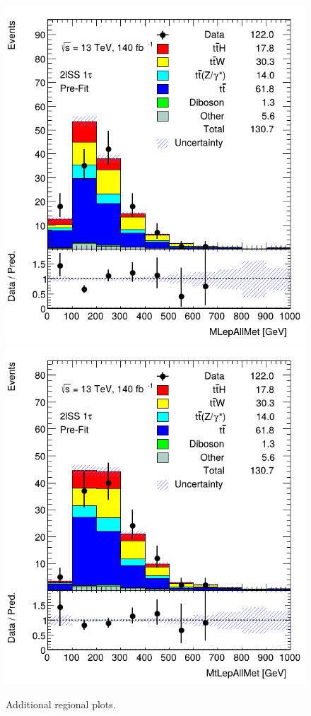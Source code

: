 \begin{figure}[ht!]
    \includegraphics[scale=0.25]{res/AnalysisPlots/wData/mlep-all-met.png}
    \includegraphics[scale=0.25]{res/AnalysisPlots/wData/mtlep-all-met.png}

    \caption{Additional regional plots.}
    \label{additionalValidationPlots}
\end{figure}